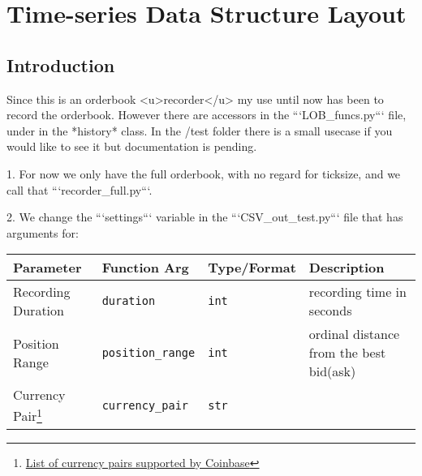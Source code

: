 \section{Time-series Data Structure Layout}

\subsection{Introduction}


Since this is an orderbook <u>recorder</u> my use until now has been to record the orderbook. However there are accessors in the ```LOB\_funcs.py``` file, under in the *history* class. In the /test folder there is a small usecase if you would like to see it but documentation is pending.

1. For now we only have the full orderbook, with no regard for ticksize, and we call that ```recorder\_full.py```. 

2. We change the ```settings``` variable in the ```CSV\_out\_test.py``` file that has arguments for:

\begin{center}
	\begin{tabular}{|l|l|l|l|}
		\hline
		Parameter & Function Arg & Type/Format & Description \\
		\hline
		Recording Duration & \texttt{duration}& \texttt{int} & recording time in seconds\\
		Position Range & \texttt{position\_range} & \texttt{int} & ordinal distance from the best bid(ask)\\
		Currency Pair\footnote{\href{https://help.coinbase.com/en/pro/trading-and-funding/cryptocurrency-trading-pairs/locations-and-trading-pairs}{List of currency pairs supported by Coinbase}} & \texttt{currency\_pair} & \texttt{str} &\\
		\hline
	\end{tabular}
	
\end{center}


